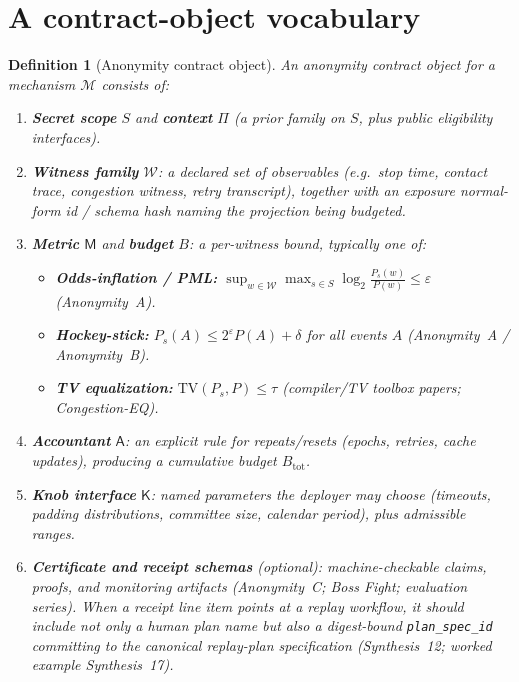 \documentclass[11pt]{article}
\newtheorem{definition}{Definition}
\newcommand{\TV}{\mathrm{TV}}
\newcommand{\eps}{\varepsilon}
\newcommand{\logtwo}{\log_2}
\begin{document}
\section{A contract-object vocabulary}
\begin{definition}[Anonymity contract object]\label{def:contract}
An \emph{anonymity contract object} for a mechanism $\mathcal M$ consists of:
\begin{enumerate}[leftmargin=*]
\item \textbf{Secret scope} $S$ and \textbf{context} $\Pi$ (a prior family on $S$, plus public eligibility interfaces).
\item \textbf{Witness family} $\mathcal W$: a declared set of observables (e.g.\ stop time, contact trace, congestion witness, retry transcript), together with an exposure normal-form id / schema hash naming the projection being budgeted.\cite{series:traceifaces}
\item \textbf{Metric} $\mathsf M$ and \textbf{budget} $B$: a per-witness bound, typically one of:
  \begin{itemize}
  \item \textbf{Odds-inflation / PML:} $\sup_{w\in\mathcal W}\max_{s\in S}\logtwo\frac{P_s(w)}{P(w)}\le \eps$ (Anonymity~A).
  \item \textbf{Hockey-stick:} $P_s(A)\le 2^\eps P(A)+\delta$ for all events $A$ (Anonymity~A / Anonymity~B).
  \item \textbf{TV equalization:} $\TV(P_s, P)\le \tau$ (compiler/TV toolbox papers; Congestion-EQ).
  \end{itemize}
\item \textbf{Accountant} $\mathsf A$: an explicit rule for repeats/resets (epochs, retries, cache updates), producing a cumulative budget $B_{\mathrm{tot}}$.
\item \textbf{Knob interface} $\mathsf K$: named parameters the deployer may choose (timeouts, padding distributions, committee size, calendar period), plus admissible ranges.
\item \textbf{Certificate and receipt schemas} (optional): machine-checkable claims, proofs, and monitoring artifacts (Anonymity~C; Boss Fight; evaluation series). When a receipt line item points at a replay workflow, it should include not only a human plan name but also a digest-bound \texttt{plan\_spec\_id} committing to the canonical replay-plan specification (Synthesis~12; worked example Synthesis~17).
\end{enumerate}
\end{definition}
\end{document}
